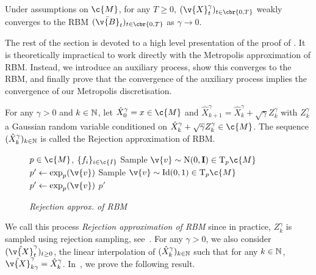 \begin{theorem}
	\label{thm:weak_convergence_metropolis}
	Under assumptions on $\c{M}$, for any $T \geq 0$, $(\v{X}_t^\gamma)_{t \in \cbr{0,T}}$ weakly converges to the RBM $(\bar{\v{B}}_t)_{t \in \cbr{0,T}}$ as $\gamma \to 0$.

\end{theorem}

The rest of the section is devoted to a high level presentation of the proof of .
It is theoretically impractical to work directly with the Metropolis approximation of RBM.
Instead, we introduce an auxiliary process, show this converges to the RBM, and finally prove that the convergence of the auxiliary process implies the convergence of our Metropolis discretisation.

\begin{definition}
	For any $\gamma > 0$ and $k \in \mathbb{N}$, let $\hat{X}_0^\gamma = x \in \c{M}$ and $\hat{X}_{k+1}^\gamma = \hat{X}_k^\gamma + \sqrt{\gamma} Z_k^\gamma$ with $Z_k^\gamma$ a Gaussian random variable conditioned on $\hat{X}_k^\gamma + \sqrt{\gamma} Z_k^\gamma \in \c{M}$.
	The sequence $(\hat{X}_k^\gamma)_{k \in \mathbb{N}}$ is called the Rejection approximation of RBM.
\end{definition}

\begin{figure}
	\begin{minipage}{0.42\textwidth}
		\begin{algorithm}[H]
			\caption{\emph{Rejection approx. of RBM}}
			\label{alg:rejection_sampling}
			\begin{algorithmic}
				\Require \(p \in \c{M}\), \(\{f_i\}_{i \in \c{I}}\)
				\State Sample \(\v{v} \sim \mathrm{N}(0,\m{I}) \in \mathrm{T}_p\c{M}\)
				\State \(p' \gets \exp_{p}(\v{v})\)
				\State Sample \(\v{v} \sim \mathrm{Id}(0,1) \in \mathrm{T}_p\c{M}\)
				\State \(p' \gets \exp_{p}(\v{v})\)
				\EndWhile
				\Return \(p'\)
			\end{algorithmic}
		\end{algorithm}
	\end{minipage}
\end{figure}

We call this process \emph{Rejection approximation of RBM} since in practice, $Z_k^\gamma$ is sampled using rejection sampling, see~.
For any $\gamma > 0$, we also consider $(\hat{\v{X}}_t^\gamma)_{t \geq 0}$, the linear interpolation of $(\hat{X}^\gamma_k)_{k \in \mathbb{N}}$ such that for any $k \in \mathbb{N}$, $\hat{\v{X}}_{k \gamma}^\gamma = \hat{X}_k^\gamma$.
In~, we prove the following result.

